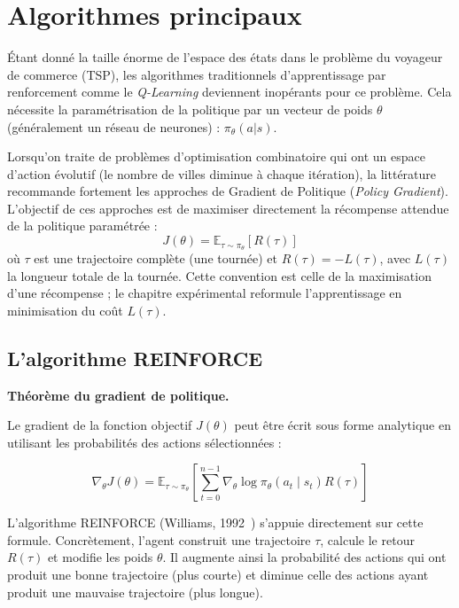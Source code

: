\documentclass[12pt, a4paper, twoside, openright]{book}
\newcommand{\E}{\mathbb{E}}
\begin{document}
	\section{Algorithmes principaux}
	\label{sec:algos_principaux}
	
	Étant donné la taille énorme de l'espace des états dans le problème du voyageur de commerce (TSP), les algorithmes traditionnels d'apprentissage par renforcement comme le \textit{Q-Learning} deviennent inopérants pour ce problème. Cela nécessite la paramétrisation de la politique par un vecteur de poids $\theta$ (généralement un réseau de neurones) : $\pi_\theta(a|s)$.
	
	Lorsqu'on traite de problèmes d'optimisation combinatoire qui ont un espace d'action évolutif (le nombre de villes diminue à chaque itération), la littérature recommande fortement les approches de Gradient de Politique (\textit{Policy Gradient}). L'objectif de ces approches est de maximiser directement la récompense attendue de la politique paramétrée :
	\begin{equation}
		J(\theta) = \E_{\tau \sim \pi_\theta} \left[ R(\tau) \right]
	\end{equation}
	où $\tau$ est une trajectoire complète (une tournée) et $R(\tau)=-L(\tau)$, avec $L(\tau)$ la longueur totale de la tournée. Cette convention est celle de la maximisation d'une récompense ; le chapitre expérimental reformule l'apprentissage en minimisation du coût $L(\tau)$.
	
	\subsection{L'algorithme REINFORCE}
	
	\textbf{Théorème du gradient de politique.}
	
	Le gradient de la fonction objectif $J(\theta)$ peut être écrit sous forme analytique en utilisant les probabilités des actions sélectionnées :
	
	\begin{equation}
		\nabla_\theta J(\theta) = \E_{\tau \sim \pi_\theta} \left[ \sum_{t=0}^{n-1} \nabla_\theta \log \pi_\theta(a_t \mid s_t) R(\tau) \right]
	\end{equation}
	
	L'algorithme REINFORCE (Williams, 1992~\cite{williams1992simple}) s'appuie directement sur cette formule. Concrètement, l'agent construit une trajectoire $\tau$, calcule le retour $R(\tau)$ et modifie les poids $\theta$. Il augmente ainsi la probabilité des actions qui ont produit une \og bonne \fg{} trajectoire (plus courte) et diminue celle des actions ayant produit une \og mauvaise \fg{} trajectoire (plus longue).
	
\end{document}
